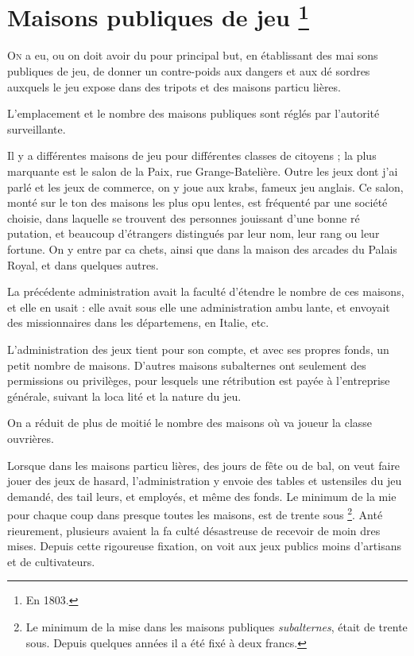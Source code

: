 \chapter
  [Maisons publiques de Jeu]
  {Maisons publiques de jeu \footnote{En 1803.}}

\lettrine{O}{n} a eu, ou on doit avoir du pour
principal but, en établissant des mai%
sons publiques de jeu, de donner un
contre-poids aux dangers et aux dé%
sordres auxquels le jeu expose dans
des tripots et des maisons particu%
lières.

L'emplacement et le nombre des
maisons publiques sont réglés par
l'autorité surveillante.

Il y a différentes maisons de jeu
pour différentes classes de citoyens ;
la plus marquante est le salon de la
Paix, rue Grange-Batelière. Outre
les jeux dont j'ai parlé et les jeux
de commerce, on y joue aux krabs,
fameux jeu anglais. Ce salon, monté
sur le ton des maisons les plus opu%
lentes, est fréquenté par une société
choisie, dans laquelle se trouvent des
personnes jouissant d'une bonne ré%
putation, et beaucoup d'étrangers
distingués par leur nom, leur rang
ou leur fortune. On y entre par ca%
chets, ainsi que dans la maison des
arcades du Palais Royal, et dans
quelques autres.

La précédente administration avait 
la faculté d'étendre le nombre de ces
maisons, et elle en usait : elle avait
sous elle une administration ambu%
lante, et envoyait des missionnaires
dans les départemens, en Italie, etc.

L'administration des jeux tient pour
son compte, et avec ses propres fonds,
un petit nombre de maisons. D'autres
maisons subalternes ont seulement
des permissions ou privilèges, pour
lesquels une rétribution est payée à
l'entreprise générale, suivant la loca%
lité et la nature du jeu.

On a réduit de plus de moitié le
nombre des maisons où va joueur la
classe ouvrières.

Lorsque dans les maisons particu%
lières, des jours de fête ou de bal,
on veut faire jouer des jeux de hasard,
l'administration y envoie des tables et
ustensiles du jeu demandé, des tail%
leurs, et employés, et même des
fonds. Le minimum de la mie pour
chaque coup dans presque toutes les
maisons, est de trente sous
\footnote{Le minimum de la mise dans les maisons publiques
\emph{subalternes}, était de trente sous. Depuis quelques années
il a été fixé à deux francs.}. Anté%
rieurement, plusieurs avaient la fa%
culté désastreuse de recevoir de moin%
dres mises. Depuis cette rigoureuse
fixation, on voit aux jeux publics
moins d'artisans et de cultivateurs.

